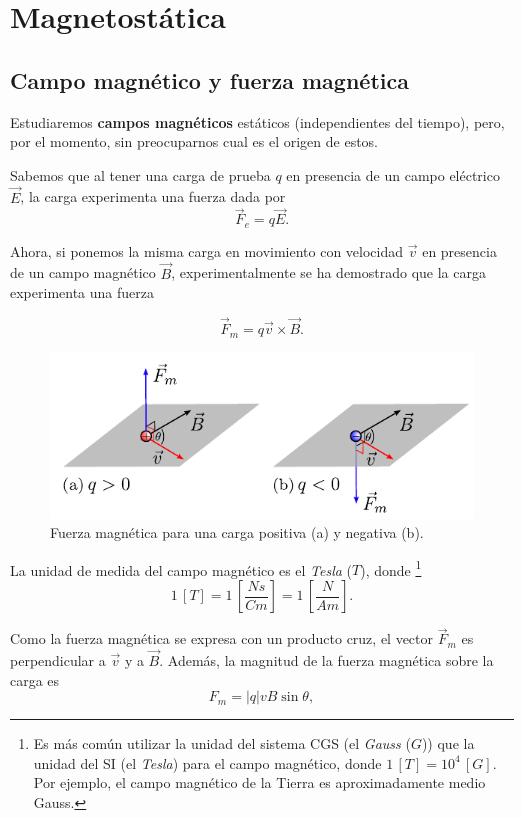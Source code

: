 \chapter{Magnetostática}

\section{Campo magnético y fuerza magnética}

Estudiaremos \textbf{campos magnéticos} estáticos (independientes del tiempo), pero, por el momento, sin preocuparnos cual es el origen de estos. 

Sabemos que al tener una carga de prueba $q$ en presencia de un campo eléctrico $\vec{E}$, la carga experimenta una fuerza dada por
$$\vec{F}_e = q \vec{E}.$$

Ahora, si ponemos la misma carga en movimiento con  velocidad $\vec{v}$ en presencia de un campo magnético $\vec{B}$, experimentalmente se ha demostrado que la carga experimenta una fuerza
\begin{shaded}
$$\vec{F}_m = q\vec{v} \times \vec{B}.$$
\end{shaded}

\begin{figure}[H]
    \centering
    \includegraphics[scale = 1.4]{Figuras/Fuerza-Magnetica.pdf}
    \caption{Fuerza magnética para una carga positiva (a) y negativa (b).}
    \label{fig:Fuerza-Magnetica}
\end{figure}

La unidad de medida del campo magnético es el \textit{Tesla} ($T$), donde \footnote{Es más común utilizar la unidad del sistema CGS (el \textit{Gauss} ($G$)) que la unidad del SI (el \textit{Tesla}) para el campo magnético, donde $1 \, [T] = 10^4 \, [G]$. Por ejemplo, el campo magnético de la Tierra es aproximadamente medio Gauss.}
$$1 \,[T] = 1 \, \left[ \frac{N s}{C m } \right] = 1 \,\left[ \frac{N}{A  m } \right].$$

Como la fuerza magnética se expresa con un producto cruz, el vector $\vec{F}_m$ es perpendicular a $\vec{v}$ y a $\vec{B}$. Además, la magnitud de la fuerza magnética sobre la carga es 
$$F_m = |q| vB \sin \theta,$$

